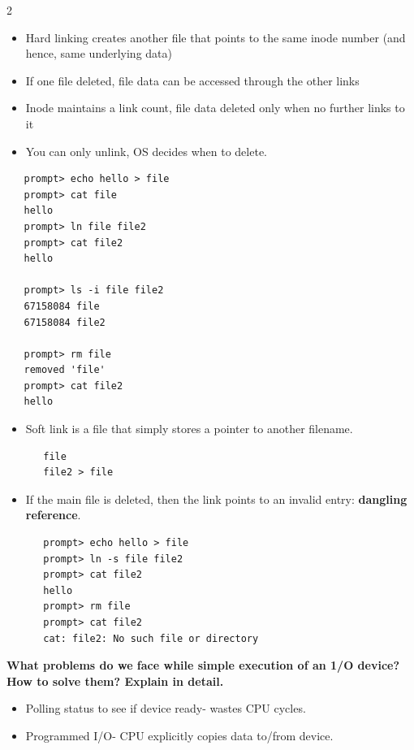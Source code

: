 \begin{multicols}{2}
   \begin{itemize}[leftmargin=*, noitemsep]
      \item Hard linking creates another file that points to the same inode number (and hence, same underlying data)
      \item If one file deleted, file data can be accessed through the other links
      \item Inode maintains a link count, file data deleted only when no further links to it
      \item You can only unlink, OS decides when to delete.
   \end{itemize}

\begin{verbatim} 
   prompt> echo hello > file
   prompt> cat file
   hello
   prompt> ln file file2
   prompt> cat file2
   hello
   
   prompt> ls -i file file2
   67158084 file
   67158084 file2
   
   prompt> rm file
   removed 'file'
   prompt> cat file2
   hello
\end{verbatim}


\begin{itemize}[leftmargin=*, noitemsep]
   \item Soft link is a file that simply stores a pointer to another filename.
\begin{verbatim}
   file
   file2 > file
\end{verbatim}
\vspace{0.5em}   

   \item If the main file is deleted, then the link points to an invalid entry: \textbf{dangling reference}.
   
\begin{verbatim}
   prompt> echo hello > file
   prompt> ln -s file file2
   prompt> cat file2
   hello
   prompt> rm file
   prompt> cat file2
   cat: file2: No such file or directory
\end{verbatim}
\end{itemize}

\columnbreak
\vspace{1em}
\textbf{What problems do we face while simple execution of an 1/O device? How to solve them? Explain in detail.}
\begin{itemize}[noitemsep]
   \item Polling status to see if device ready- wastes CPU cycles.
   \item Programmed I/O- CPU explicitly copies data to/from device.
\end{itemize}


\end{multicols}
